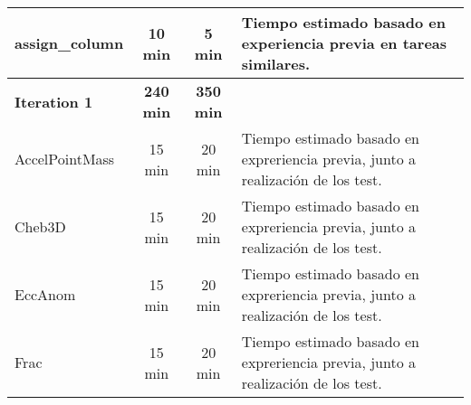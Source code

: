 \documentclass[12pt,a4paper]{article}
\begin{document}
\begin{center}
\begin{tabular}{|p{3cm}|c|c|p{6cm}|}
        \hline
        assign\_column & 10 min & 5 min & Tiempo estimado basado en experiencia previa en tareas similares.\\
        \hline
        \textbf{Iteration 1} & \textbf{240 min} & \textbf{350 min} & \\
        \hline
        AccelPointMass & 15 min & 20 min & Tiempo estimado basado en expreriencia previa, junto a realización de los test.\\
        \hline
        Cheb3D & 15 min & 20 min & Tiempo estimado basado en expreriencia previa, junto a realización de los test.\\
        \hline
        EccAnom & 15 min & 20 min & Tiempo estimado basado en expreriencia previa, junto a realización de los test.\\
        \hline
        Frac & 15 min & 20 min & Tiempo estimado basado en expreriencia previa, junto a realización de los test.\\
        \hline
    \end{tabular}
 \end{center}
\end{document}
